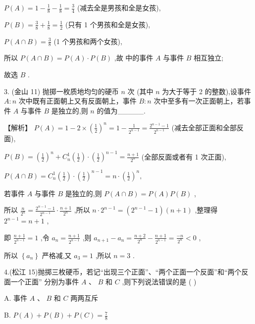 \documentclass[10pt]{article}
\newcommand*\circled[1]{\tikz[baseline=(char.base)]{\node[shape=circle,draw,inner sep=1.5pt] (char) {\small #1};}}
\begin{document}
\(P\left( A\right)  = 1 - \frac{1}{8} - \frac{1}{8} = \frac{3}{4}\) (减去全是男孩和全是女孩),

\(P\left( B\right)  = \frac{3}{8} + \frac{1}{8} = \frac{1}{2}\) (只有 1 个男孩和全是女孩),

\(P\left( {A \cap  B}\right)  = \frac{3}{8}\) (1 个男孩和两个女孩),

所以 \(P\left( {A \cap  B}\right)  = P\left( A\right)  \cdot  P\left( B\right)\) ,故 \circled{2} 中的事件 \(A\) 与事件 \(B\) 相互独立;

故选 \(B\) .

3. (金山 11) 抛掷一枚质地均匀的硬币 \(n\) 次 (其中 \(n\) 为大于等于 2 的整数),设事件 \(A : n\) 次中既有正面朝上又有反面朝上，事件 \(B : n\) 次中至多有一次正面朝上，若事件 \(A\) 与事件 \(B\) 是独立的,则 \(n\) 的值为\_\_\_\_\_.

【解析】 \(P\left( A\right)  = 1 - 2 \times  {\left( \frac{1}{2}\right) }^{n} = 1 - \frac{1}{{2}^{n - 1}} = \frac{{2}^{n - 1} - 1}{{2}^{n - 1}}\) (减去全部正面和全部反面),

\(P\left( B\right)  = {\left( \frac{1}{2}\right) }^{n} + {C}_{n}^{1}\left( \frac{1}{2}\right)  \cdot  {\left( \frac{1}{2}\right) }^{n - 1} = \frac{n + 1}{{2}^{n}}\) (全部反面或者有 1 次正面),

\(P\left( {A \cap  B}\right)  = {C}_{n}^{1}\left( \frac{1}{2}\right)  \cdot  {\left( \frac{1}{2}\right) }^{n - 1} = n \cdot  {\left( \frac{1}{2}\right) }^{n},\)

若事件 \(A\) 与事件 \(B\) 是独立的,则 \(P\left( {A \cap  B}\right)  = P\left( A\right) P\left( B\right)\) ,

所以 \(\frac{n}{{2}^{n}} = \frac{{2}^{n - 1} - 1}{{2}^{n - 1}} \cdot  \frac{n + 1}{{2}^{n}}\) ,所以 \(n \cdot  {2}^{n - 1} = \left( {{2}^{n - 1} - 1}\right) \left( {n + 1}\right)\) ,整理得 \({2}^{n - 1} = n + 1\) ,

即 \(\frac{n + 1}{{2}^{n - 1}} = 1\) ,令 \({a}_{n} = \frac{n + 1}{{2}^{n - 1}}\) ,则 \({a}_{n + 1} - {a}_{n} = \frac{n + 2}{{2}^{n}} - \frac{n + 1}{{2}^{n - 1}} = \frac{-n}{{2}^{n}} < 0\) ,

所以 \(\left\{  {a}_{n}\right\}\) 严格减,又 \({a}_{3} = 1\) ,所以 \(n = 3\) .

4.(松江 15)抛掷三枚硬币，若记“出现三个正面”、“两个正面一个反面”和“两个反面一个正面” 分别为事件 \(A\text{ 、 }B\) 和 \(C\) ,则下列说法错误的是 ( )

A. 事件 \(A\text{ 、 }B\) 和 \(C\) 两两互斥

B. \(P\left( A\right)  + P\left( B\right)  + P\left( C\right)  = \frac{7}{8}\)
\end{document}
